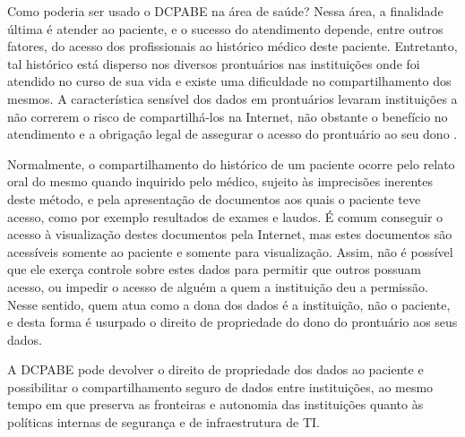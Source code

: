 \documentclass[a4paper,11pt]{article}
\begin{document}
Como poderia ser usado o DCPABE na área de saúde? Nessa área, a finalidade última é atender ao paciente, e o sucesso do atendimento depende, entre outros fatores, do acesso dos profissionais ao histórico médico deste paciente.
Entretanto, tal histórico está disperso nos diversos prontuários nas instituições onde foi atendido no curso de sua vida e existe uma dificuldade no compartilhamento dos mesmos.
A característica sensível dos dados em prontuários levaram instituições a não correrem o risco de compartilhá-los na Internet, não obstante o benefício no atendimento e a obrigação legal de assegurar o acesso do prontuário ao seu dono \cite{ConselhoFederaldeMedicina2019}.

Normalmente, o compartilhamento do histórico de um paciente ocorre pelo relato oral do mesmo quando inquirido pelo médico, sujeito às imprecisões inerentes deste método, e pela apresentação de documentos aos quais o paciente teve acesso, como por exemplo resultados de exames e laudos.
É comum conseguir o acesso à visualização destes documentos pela Internet, mas estes documentos são acessíveis somente ao paciente e somente para visualização. Assim, não é possível que ele exerça controle sobre estes dados para permitir que outros possuam acesso, ou impedir o acesso de alguém a quem a instituição deu a permissão. Nesse sentido, quem atua como a dona dos dados é a instituição, não o paciente, e desta forma é usurpado o direito de propriedade do dono do prontuário aos seus dados.


A DCPABE pode devolver o direito de propriedade dos dados ao paciente e possibilitar o compartilhamento seguro de dados entre instituições, ao mesmo tempo em que preserva as fronteiras e autonomia das instituições quanto às políticas internas de segurança e de infraestrutura de TI.

\end{document}
